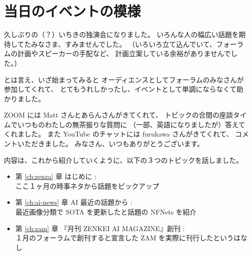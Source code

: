 \documentclass[dvipdfmx,autodetect-engine,10pt,b5paper,papersize,openany,dvipsnames]{jsbook}
\begin{document}
\chapter{当日のイベントの模様}
\label{sec:introduction}


久しぶりの（？）いちきの独演会になりました。
いろんな人の幅広い話題を期待してたみなさま、すみませんでした。
（いろいろ立て込んでいて、フォーラムの計画やスピーカーの手配など、
計画立案している余裕がありませんでした。）

とは言え、いざ始まってみると
オーディエンスとしてフォーラムのみなさんが参加してくれて、
とてもうれしかったし、イベントとして単調にならなくて助かりました。

\vspace{1cm}


ZOOM には Matt さんとあらんさんがきてくれて、
トピックの合間の座談タイムでいつものわたしの無茶振りな質問に
（一部、英語になりましたが）答えてくれました。
また YouTube のチャットには furukawa さんがきてくれて、
コメントいただきました。
みなさん、いつもありがとうございます。


内容は、これから紹介していくように、以下の３つのトピックを話しました。
\begin{itemize}
\item 第 \ref{ch:zenza} 章 はじめに :\\
  ここ１ヶ月の時事ネタから話題をピックアップ
\item 第 \ref{ch:ai-news} 章 AI 最近の話題から :\\
  最近画像分類で SOTA を更新したと話題の NFNets を紹介
\item 第 \ref{ch:zam} 章 『月刊 ZENKEI AI MAGAZINE』創刊 :\\
  １月のフォーラムで創刊すると宣言した ZAM を実際に刊行したというはなし
\end{itemize}
\end{document}

